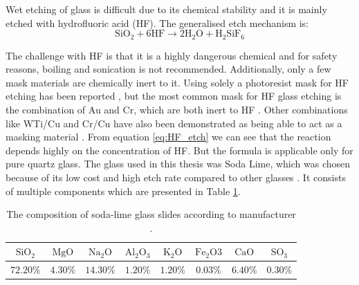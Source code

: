 \documentclass[final]{jyflluk}
\begin{document}
Wet etching of glass is difficult due to its chemical stability and it is mainly etched with hydrofluoric acid (HF). The generalised etch mechanism is: \cite{etch_formula}
\begin{equation}
    \label{eq:HF_etch}
    \mathrm{SiO_2} + \mathrm{6HF} \rightarrow  \mathrm{2H_2 O} + \mathrm{H_2 Si F_6}
\end{equation}

The challenge with HF is that it is a highly dangerous chemical and for safety reasons, boiling and sonication is not recommended. Additionally, only a few mask materials are chemically inert to it.  Using solely a photoresist mask for HF etching has been reported \cite{lin2001fast,guanglong2012microfluidic}, but the most common mask for HF glass etching is the combination of Au and Cr, which are both inert to HF \cite{iliescu2005characterization,tay2006defect}. Other combinations like WTi/Cu and Cr/Cu have also been demonstrated as being able to act as a masking material \cite{Hgglund2013CharacterizationOM,iliescu2008wet}.
From equation \ref{eq:HF_etch} we can see that the reaction depends highly on the concentration of HF. But the formula is applicable only for pure quartz glass. The glass used in this thesis was Soda Lime, which was chosen because of its low cost and high etch rate compared to other glasses \cite{srivannavit2004design}. It consists of multiple components which are presented in Table \ref{tab:soda_lime}. 
\begin{table}[h]
    \centering
    \caption{The composition of soda-lime glass slides according to manufacturer \cite{Soda_lime_ONLINE}.}
    \label{tab:soda_lime}
    \begin{tabular}{cccccccc} \toprule
       $\mathrm{SiO_2}$  & $\mathrm{MgO}$   &  $\mathrm{Na_2 O}$ & $\mathrm{Al_2 O_3}$ &  $\mathrm{K_2 O}$ &  $\mathrm{Fe_2O3}$ &  $\mathrm{CaO}$ & $\mathrm{SO_3}$ \\ \midrule

       $72.20 \percent$  &  $4.30 \percent$ &  $14.30 \percent$  & $1.20 \percent$     &  $1.20 \percent$  & $0.03 \percent$    & $6.40 \percent$ & $0.30 \percent$\\ \bottomrule
    \end{tabular}
\end{table} 
\end{document}
